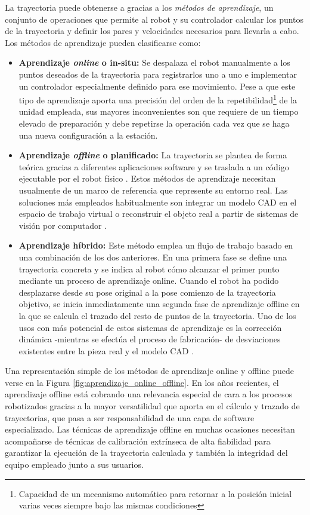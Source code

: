 La trayectoria puede obtenerse a gracias a los \textit{métodos de aprendizaje}, un conjunto de operaciones que permite al robot y su controlador calcular los puntos de la trayectoria y definir los pares y velocidades necesarios para llevarla a cabo. Los métodos de aprendizaje pueden clasificarse como:
\begin{itemize}
    \item \textbf{Aprendizaje \textit{online} o in-situ:} Se despalaza el robot manualmente a los puntos deseados de la trayectoria para registrarlos uno a uno e implementar un controlador especialmente definido para ese movimiento. Pese a que este tipo de aprendizaje aporta una precisión del orden de la repetibilidad\footnote{Capacidad de un mecanismo automático para retornar a la posición inicial varias veces siempre bajo las mismas condiciones} de la unidad empleada, sus mayores inconvenientes son que requiere de un tiempo elevado de preparación y debe repetirse la operación cada vez que se haga una nueva configuración a la estación. 
    \item \textbf{Aprendizaje \textit{offline} o planificado:} La trayectoria se plantea de forma teórica gracias a diferentes aplicaciones software y se traslada a un código ejecutable por el robot físico \cite{Botazzi_2005}. Estos métodos de aprendizaje necesitan usualmente de un marco de referencia que represente su entorno real. Las soluciones más empleados habitualmente son integrar un modelo \acrshort{CAD} en el espacio de trabajo virtual \cite{Botazzi_2006} o reconstruir el objeto real a partir de sistemas de visión por computador \cite{Liu_2010}.
    \item \textbf{Aprendizaje híbrido:} Este método emplea un flujo de trabajo basado en una combinación de los dos anteriores. En una primera fase se define una trayectoria concreta y se indica al robot cómo alcanzar el primer punto mediante un proceso de aprendizaje online. Cuando el robot ha podido desplazarse desde su pose original a la pose comienzo de la trayectoria objetivo, se inicia inmediatamente una segunda fase de aprendizaje offline en la que se calcula el trazado del resto de puntos de la trayectoria. Uno de los usos con más potencial de estos sistemas de aprendizaje es la corrección dinámica -mientras se efectúa el proceso de fabricación- de desviaciones existentes entre la pieza real y el modelo \acrshort{CAD} \cite{Zheng_2022}.
\end{itemize}
    
Una representación simple de los métodos de aprendizaje online y offline puede verse en la Figura \ref{fig:aprendizaje_online_offline}. En los años recientes, el aprendizaje offline está cobrando una relevancia especial de cara a los procesos robotizados gracias a la mayor versatilidad que aporta en el cálculo y trazado de trayectorias, que pasa a ser responsabilidad de una capa de software especializado. Las técnicas de aprendizaje offline en muchas ocasiones necesitan acompañarse de técnicas de calibración extrínseca de alta fiabilidad para garantizar la ejecución de la trayectoria calculada y también la integridad del equipo empleado junto a sus usuarios.

